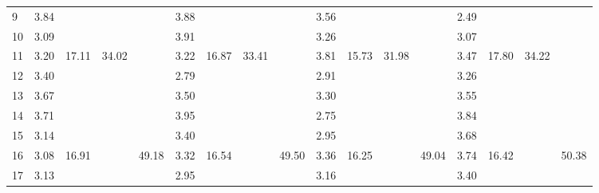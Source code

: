 \begin{center}
\begin{tabular}{| l || c | c | c | c | c | c | c | c | c | c | c | c | c | c | c | c |}
9 & \multirow{1}{*}{ 3.84 }  & & & & \multirow{1}{*}{ 3.88 }  & & & & \multirow{1}{*}{ 3.56 }  & & & & \multirow{1}{*}{ 2.49 }  & & & \\\cline{2-2}\cline{6-6}\cline{10-10}\cline{14-14}
10 & \multirow{1}{*}{ 3.09 }  & & & & \multirow{1}{*}{ 3.91 }  & & & & \multirow{1}{*}{ 3.26 }  & & & & \multirow{1}{*}{ 3.07 }  & & & \\\cline{2-2}\cline{6-6}\cline{10-10}\cline{14-14}\cline{3-3}\cline{7-7}\cline{11-11}\cline{15-15}\cline{4-4}\cline{8-8}\cline{12-12}\cline{16-16}
11 & \multirow{1}{*}{ 3.20 }  & \multirow{5}{*}{ 17.11 }  & \multirow{10}{*}{ 34.02 }  & & \multirow{1}{*}{ 3.22 }  & \multirow{5}{*}{ 16.87 }  & \multirow{10}{*}{ 33.41 }  & & \multirow{1}{*}{ 3.81 }  & \multirow{5}{*}{ 15.73 }  & \multirow{10}{*}{ 31.98 }  & & \multirow{1}{*}{ 3.47 }  & \multirow{5}{*}{ 17.80 }  & \multirow{10}{*}{ 34.22 }  & \\\cline{2-2}\cline{6-6}\cline{10-10}\cline{14-14}
12 & \multirow{1}{*}{ 3.40 }  & & & & \multirow{1}{*}{ 2.79 }  & & & & \multirow{1}{*}{ 2.91 }  & & & & \multirow{1}{*}{ 3.26 }  & & & \\\cline{2-2}\cline{6-6}\cline{10-10}\cline{14-14}
13 & \multirow{1}{*}{ 3.67 }  & & & & \multirow{1}{*}{ 3.50 }  & & & & \multirow{1}{*}{ 3.30 }  & & & & \multirow{1}{*}{ 3.55 }  & & & \\\cline{2-2}\cline{6-6}\cline{10-10}\cline{14-14}
14 & \multirow{1}{*}{ 3.71 }  & & & & \multirow{1}{*}{ 3.95 }  & & & & \multirow{1}{*}{ 2.75 }  & & & & \multirow{1}{*}{ 3.84 }  & & & \\\cline{2-2}\cline{6-6}\cline{10-10}\cline{14-14}
15 & \multirow{1}{*}{ 3.14 }  & & & & \multirow{1}{*}{ 3.40 }  & & & & \multirow{1}{*}{ 2.95 }  & & & & \multirow{1}{*}{ 3.68 }  & & & \\\cline{2-2}\cline{6-6}\cline{10-10}\cline{14-14}\cline{3-3}\cline{7-7}\cline{11-11}\cline{15-15}\cline{5-5}\cline{9-9}\cline{13-13}\cline{17-17}
16 & \multirow{1}{*}{ 3.08 }  & \multirow{5}{*}{ 16.91 }  & & \multirow{15}{*}{ 49.18 }  & \multirow{1}{*}{ 3.32 }  & \multirow{5}{*}{ 16.54 }  & & \multirow{15}{*}{ 49.50 }  & \multirow{1}{*}{ 3.36 }  & \multirow{5}{*}{ 16.25 }  & & \multirow{15}{*}{ 49.04 }  & \multirow{1}{*}{ 3.74 }  & \multirow{5}{*}{ 16.42 }  & & \multirow{15}{*}{ 50.38 }  \\\cline{2-2}\cline{6-6}\cline{10-10}\cline{14-14}
17 & \multirow{1}{*}{ 3.13 }  & & & & \multirow{1}{*}{ 2.95 }  & & & & \multirow{1}{*}{ 3.16 }  & & & & \multirow{1}{*}{ 3.40 }  & & & \\\cline{2-2}\cline{6-6}\cline{10-10}\cline{14-14}

\end{tabular}
\end{center}
